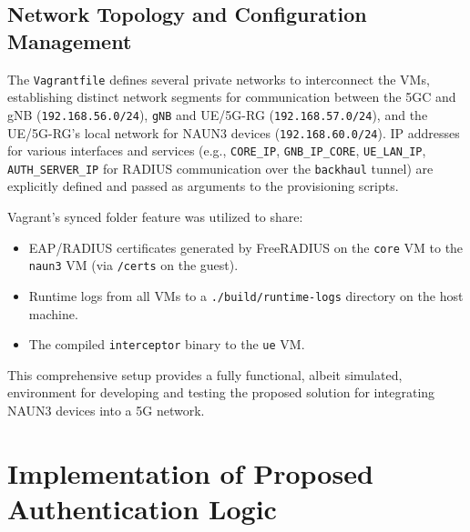 \subsection{Network Topology and Configuration Management}

The \texttt{Vagrantfile} defines several private networks to interconnect the \acp{VM}, establishing distinct network segments for communication between the \ac{5GC} and \ac{gNB} (\texttt{192.168.56.0/24}), \texttt{gNB} and \ac{UE}/\ac{5G-RG} (\texttt{192.168.57.0/24}), and the \ac{UE}/\ac{5G-RG}'s local network for \ac{NAUN3} devices (\texttt{192.168.60.0/24}). \ac{IP} addresses for various interfaces and services (e.g., \texttt{CORE\_IP}, \texttt{GNB\_IP\_CORE}, \texttt{UE\_LAN\_IP}, \texttt{AUTH\_SERVER\_IP} for \ac{RADIUS} communication over the \texttt{backhaul} tunnel) are explicitly defined and passed as arguments to the provisioning scripts.

Vagrant's synced folder feature was utilized to share:

\begin{itemize}
    \item \ac{EAP}/\ac{RADIUS} certificates generated by FreeRADIUS on the \texttt{core} \ac{VM} to the \texttt{naun3} \ac{VM} (via \texttt{/certs} on the guest).

    \item Runtime logs from all \acp{VM} to a \texttt{./build/runtime-logs} directory on the host machine.

    \item The compiled \texttt{interceptor} binary to the \texttt{ue} \ac{VM}.
\end{itemize}

This comprehensive setup provides a fully functional, albeit simulated, environment for developing and testing the proposed solution for integrating \ac{NAUN3} devices into a \ac{5G} network.

\section{Implementation of Proposed Authentication Logic}



